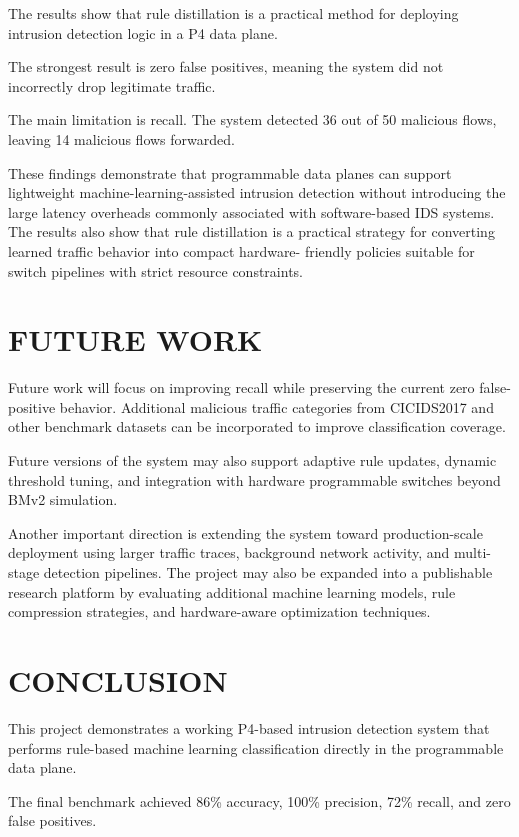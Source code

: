 \documentclass[conference]{IEEEtran}
\begin{document}
The results show that rule distillation is a practical method
for deploying intrusion detection logic in a P4 data plane.

The strongest result is zero false positives, meaning the
system did not incorrectly drop legitimate traffic.

The main limitation is recall. The system detected 36 out
of 50 malicious flows, leaving 14 malicious flows forwarded.

These findings demonstrate that programmable data planes
can support lightweight machine-learning-assisted intrusion
detection without introducing the large latency overheads
commonly associated with software-based IDS systems. The
results also show that rule distillation is a practical strategy
for converting learned traffic behavior into compact hardware-
friendly policies suitable for switch pipelines with strict
resource constraints.

\section{FUTURE WORK}

Future work will focus on improving recall while preserving
the current zero false-positive behavior. Additional malicious
traffic categories from CICIDS2017 and other benchmark
datasets can be incorporated to improve classification coverage.

Future versions of the system may also support adaptive rule
updates, dynamic threshold tuning, and integration with
hardware programmable switches beyond BMv2 simulation.

Another important direction is extending the system toward
production-scale deployment using larger traffic traces,
background network activity, and multi-stage detection
pipelines. The project may also be expanded into a publishable
research platform by evaluating additional machine learning
models, rule compression strategies, and hardware-aware
optimization techniques.

\section{CONCLUSION}

This project demonstrates a working P4-based intrusion
detection system that performs rule-based machine learning
classification directly in the programmable data plane.

The final benchmark achieved 86\% accuracy, 100\%
precision, 72\% recall, and zero false positives.
\end{document}
